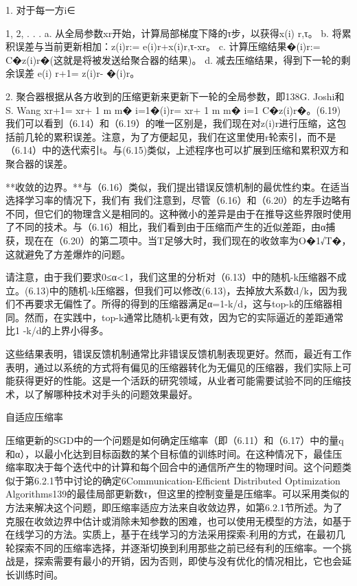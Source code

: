 1. 对于每一方i∈{1, 2, . . . a. 从全局参数xr开始，计算局部梯度下降的τ步，以获得x(i) r,τ。
	b. 将累积误差与当前更新相加：z(i)r:= e(i)r+x(i)r,τ-xr。
	c. 计算压缩结果�(i)r:= C�z(i)r�(这就是将被发送给聚合器的结果)。
	d. 减去压缩结果，得到下一轮的剩余误差 e(i) r+1= z(i)r- �(i)r。
	
	2. 聚合器根据从各方收到的压缩更新来更新下一轮的全局参数，即138G. Joshi和S. Wang xr+1= xr+ 1 m m� i=1�(i)r= xr+ 1 m m� i=1 C�z(i)r�。(6.19) 我们可以看到（6.14）和（6.19）的唯一区别是，我们现在对z(i)r进行压缩，这包括前几轮的累积误差。注意，为了方便起见，我们在这里使用r轮索引，而不是（6.14）中的迭代索引t。与(6.15)类似，上述程序也可以扩展到压缩和累积双方和聚合器的误差。
	
	**收敛的边界。**与（6.16）类似，我们提出错误反馈机制的最优性约束。在适当选择学习率的情况下，我们有
	我们注意到，尽管（6.16）和（6.20）的左手边略有不同，但它们的物理含义是相同的。这种微小的差异是由于在推导这些界限时使用了不同的技术。与（6.16）相比，我们看到由于压缩而产生的近似差距，由α捕获，现在在（6.20）的第二项中。当T足够大时，我们现在的收敛率为O�1√T�，这就避免了方差爆炸的问题。
	
	请注意，由于我们要求0≤α<1，我们这里的分析对（6.13）中的随机-k压缩器不成立。(6.13)中的随机-k压缩器，但我们可以修改(6.13)，去掉放大系数d/k，因为我们不再要求无偏性了。所得的得到的压缩器满足α=1-k/d，这与top-k的压缩器相同。然而，在实践中，top-k通常比随机-k更有效，因为它的实际逼近的差距通常比1 -k/d的上界小得多。
	
	这些结果表明，错误反馈机制通常比非错误反馈机制表现更好。然而，最近有工作表明，通过以系统的方式将有偏见的压缩器转化为无偏见的压缩器，我们实际上可能获得更好的性能。这是一个活跃的研究领域，从业者可能需要试验不同的压缩技术，以了解哪种技术对手头的问题效果最好。
	
自适应压缩率
	
	压缩更新的SGD中的一个问题是如何确定压缩率（即（6.11）和（6.17）中的量q和α），以最小化达到目标函数的某个目标值的训练时间。在这种情况下，最佳压缩率取决于每个迭代中的计算和每个回合中的通信所产生的物理时间。这个问题类似于第6.2.1节中讨论的确定6Communication-Efficient Distributed Optimization Algorithms139的最佳局部更新数τ，但这里的控制变量是压缩率。可以采用类似的方法来解决这个问题，即压缩率适应方法来自收敛边界，如第6.2.1节所述。为了克服在收敛边界中估计或消除未知参数的困难，也可以使用无模型的方法，如基于在线学习的方法。实质上，基于在线学习的方法采用探索-利用的方式，在最初几轮探索不同的压缩率选择，并逐渐切换到利用那些之前已经有利的压缩率。一个挑战是，探索需要有最小的开销，因为否则，即使与没有优化的情况相比，它也会延长训练时间。
	
}
